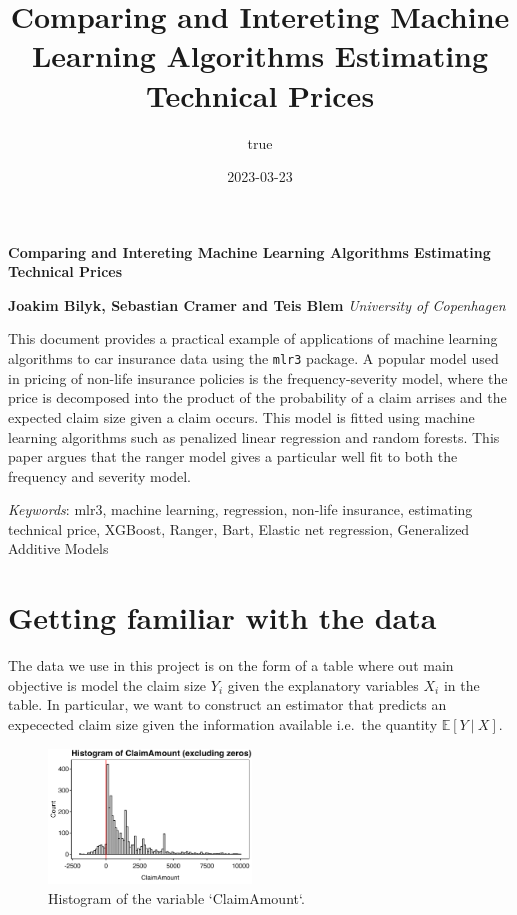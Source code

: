\documentclass[
]{article}
\title{Comparing and Intereting Machine Learning Algorithms Estimating
Technical Prices}
\author{true}
\date{2023-03-23}
\begin{document}
\Large\textbf{Comparing and Intereting Machine Learning Algorithms
Estimating Technical Prices}
\normalsize

\noindent \textbf{ Joakim Bilyk, Sebastian Cramer and Teis
Blem} \hfill  \emph{\small University of Copenhagen}   


\hbox{\vrule height .2pt width 39.14pc}

\noindent This document provides a practical example of applications of
machine learning algorithms to car insurance data using the
\texttt{mlr3} package. A popular model used in pricing of non-life
insurance policies is the frequency-severity model, where the price is
decomposed into the product of the probability of a claim arrises and
the expected claim size given a claim occurs. This model is fitted using
machine learning algorithms such as penalized linear regression and
random forests. This paper argues that the ranger model gives a
particular well fit to both the frequency and severity model.


\noindent \emph{Keywords}: mlr3, machine learning, regression, non-life
insurance, estimating technical price, XGBoost, Ranger, Bart, Elastic
net regression, Generalized Additive Models \par

 \hbox{\vrule height .2pt width 39.14pc}




{
\hypersetup{linkcolor=black}
\setcounter{tocdepth}{2}
\tableofcontents
}
\newpage

\hypertarget{getting-familiar-with-the-data}{%
\section{Getting familiar with the
data}\label{getting-familiar-with-the-data}}

The data we use in this project is on the form of a table where out main
objective is model the claim size \(Y_i\) given the explanatory
variables \(X_i\) in the table. In particular, we want to construct an
estimator that predicts an expecected claim size given the information
available i.e.~the quantity \(\mathbb E[Y\ \vert\ X]\).

\begin{figure}
  \begin{center}
    \includegraphics[width=0.48\textwidth]{figures/plot1.png}
  \end{center}
  \caption{Histogram of the variable `ClaimAmount`.}
\end{figure}
\end{document}
